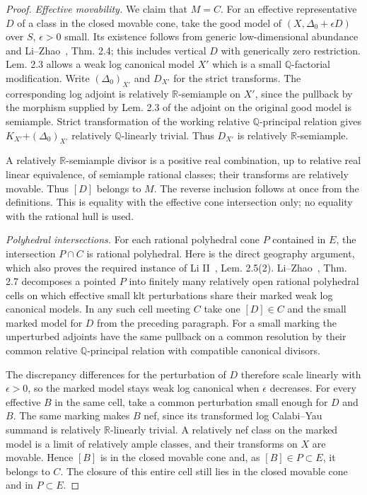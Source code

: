 \documentclass[11pt]{article}
\begin{document}
\begin{proof}
\emph{Effective movability.} We claim that \(M=C\). For an effective representative \(D\) of a class in
the closed movable cone, take the good model of \((X,\Delta_0+\epsilon D)\) over \(S\),
\(\epsilon>0\) small. Its existence follows from generic low-dimensional abundance and
Li--Zhao~\cite{LiZhao}, Thm. 2.4; this includes vertical \(D\) with generically zero restriction. Lem.
2.3 allows a weak log canonical model \(X'\) which is a small \(\mathbb Q\)-factorial modification. Write
\((\Delta_0)_{X'}\) and \(D_{X'}\) for the strict transforms. The corresponding log adjoint is relatively
\(\mathbb R\)-semiample on \(X'\), since the pullback by the morphism supplied by Lem. 2.3 of the adjoint
on the original good model is semiample. Strict transformation of the working relative \(\mathbb
Q\)-principal relation gives \(K_{X'}\)+\((\Delta_0)_{X'}\) relatively \(\mathbb Q\)-linearly trivial.
Thus \(D_{X'}\) is relatively \(\mathbb R\)-semiample.

A relatively \(\mathbb R\)-semiample divisor is a positive real combination, up to relative real linear
equivalence, of semiample rational classes; their transforms are relatively movable. Thus \([D]\) belongs
to \(M\). The reverse inclusion follows at once from the definitions. This is equality with the effective
cone intersection only; no equality with the rational hull is used.

\emph{Polyhedral intersections.} For each rational polyhedral cone \(P\) contained in \(E\), the
intersection \(P\cap C\) is rational polyhedral. Here is the direct geography argument, which also proves
the required instance of Li II~\cite{LiII}, Lem. 2.5(2). Li--Zhao~\cite{LiZhao}, Thm. 2.7 decomposes a
pointed \(P\) into finitely many relatively open rational polyhedral cells on which effective small klt
perturbations share their marked weak log canonical models. In any such cell meeting \(C\) take one
\([D]\in C\) and the small marked model for \(D\) from the preceding paragraph. For a small
marking the unperturbed adjoints have the same pullback on a common resolution by their common relative
\(\mathbb Q\)-principal relation with compatible canonical divisors.

The discrepancy differences for the perturbation of \(D\) therefore scale linearly with
\(\epsilon>0\), so the marked model stays weak log canonical when \(\epsilon\) decreases.
For every effective \(B\) in the same cell, take a common perturbation small enough for \(D\) and \(B\).
The same marking makes \(B\) nef, since its transformed log Calabi--Yau summand is relatively \(\mathbb
R\)-linearly trivial. A relatively nef class on the marked model is a limit of relatively ample classes,
and their transforms on \(X\) are movable. Hence \([B]\) is in the closed movable cone and, as
\([B]\in P\subset E\), it belongs to \(C\). The closure of this entire cell still lies in
the closed movable cone and in \(P\subset E\).


\end{proof}
\end{document}

